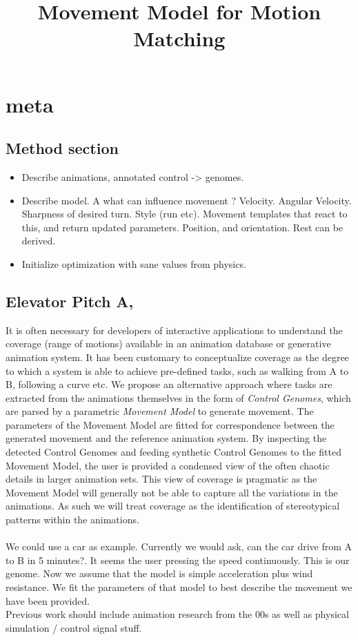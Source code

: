 \documentclass[format=acmtog]{acmart}
\begin{document}
\title{Movement Model for Motion Matching}









\maketitle

\section{meta}
\subsection{Method section}
\begin{itemize}
    \item Describe animations, annotated control -> genomes.
    \item Describe model. A what can influence movement ? Velocity. Angular Velocity. Sharpness of desired turn. Style (run etc). Movement templates that react to this, and return updated parameters. Position, and orientation. Rest can be derived.
    \item Initialize optimization with sane values from physics.
\end{itemize}

\subsection{Elevator Pitch A,}
It is often necessary for developers of interactive applications to understand the coverage (range of motions) available in an animation database or generative animation system. It has been customary to conceptualize coverage as the degree to which a system is able to achieve pre-defined tasks, such as walking from A to B, following a curve etc. We propose an alternative approach where tasks are extracted from the animations themselves in the form of \textit{Control Genomes}, which are parsed by a parametric \textit{Movement Model} to generate movement. The parameters of the Movement Model are fitted for correspondence between the generated movement and the reference animation system. By inspecting the detected Control Genomes and feeding synthetic Control Genomes to the fitted Movement Model, the user is provided a condensed view of the often chaotic details in larger animation sets. This view of coverage is pragmatic as the Movement Model will generally not be able to capture all the variations in the animations. As such we will treat coverage as the identification of stereotypical patterns within the animations.   
\\\\ 
We could use a car as example. Currently we would ask, can the car drive from A to B in 5 minutes?. It seems the user pressing the speed continuously. This is our genome. Now we assume that the model is simple acceleration plus wind resistance. We fit the parameters of that model to best describe the movement we have been provided. \\ Previous work should include animation research from the 00s as well as physical simulation / control signal stuff.  
\end{document}
